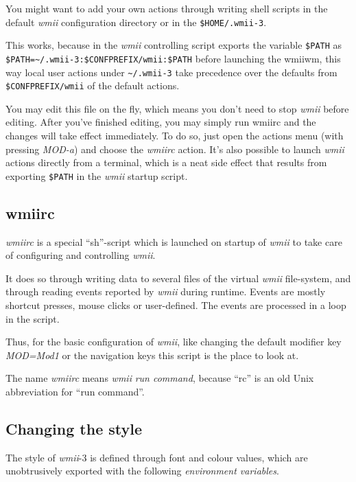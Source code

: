 \documentclass[12pt,a4paper]{article} %
\newcommand{\wmii}{\emph{wmii}}
\begin{document}
    You might want to add your own actions through writing shell scripts in the
    default \wmii{} configuration directory or in the \texttt{\$HOME/.wmii-3}.
    
    This works, because in the \wmii{} controlling script exports the variable
    \verb+$PATH+ as\\ \verb+$PATH=~/.wmii-3:$CONFPREFIX/wmii:$PATH+ before
    launching the wmiiwm, this way local user actions under
    \verb+~/.wmii-3+ take precedence over the defaults from
    \verb+$CONFPREFIX/wmii+ of the default actions.
    
    You may edit this file on the fly, which means you don't need to
    stop \wmii{} before editing. After you've finished editing, you may
    simply run wmiirc and the changes will take effect immediately.
    To do so, just open the actions menu (with pressing \emph{MOD-a}) and
    choose the \emph{wmiirc} action. It's also possible to launch \wmii{} actions
    directly from a terminal, which is a neat side effect that results from
    exporting \verb+$PATH+ in the \wmii{} startup script.

    \subsection{wmiirc}
    
    \emph{wmiirc} is a special ``sh''-script which is launched on startup
    of \wmii{} to take care of configuring and controlling \wmii.

    It does so through writing data to several files of the virtual \wmii
    file-system, and through reading events reported by \wmii{} during runtime.
    Events are mostly shortcut presses, mouse clicks or user-defined.
    The events are processed in a loop in the script.
    
    Thus, for the basic configuration of \wmii, like changing the default
    modifier key \emph{MOD=Mod1} or the navigation keys this script is
    the place to look at.

    The name \emph{wmiirc} means \wmii{} \emph{run command}, because ``rc'' is an
    old Unix abbreviation for ``run command''.

    \subsection{Changing the style}

    The style of \wmii-3 is defined through font and colour values, which are
    unobtrusively exported with the following \emph{environment variables}.
\end{document}
